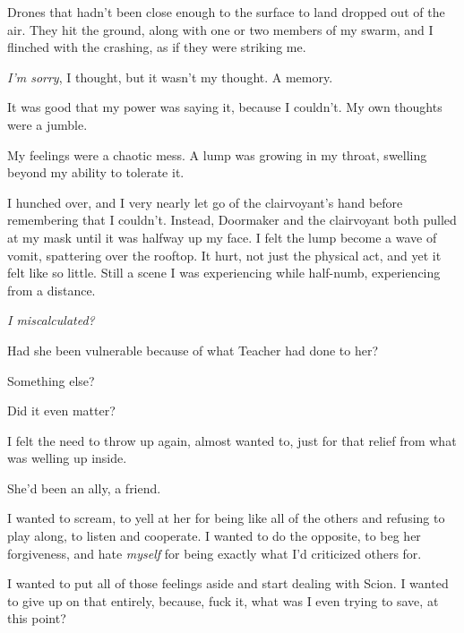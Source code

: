 Drones that hadn't been close enough to the surface to land dropped out of the air.  They hit the ground, along with one or two members of my swarm, and I flinched with the crashing, as if they were striking me.



\emph{I'm sorry}, I thought, but it wasn't my thought.  A memory.



It was good that my power was saying it, because I couldn't.  My own thoughts were a jumble.



My feelings were a chaotic mess.  A lump was growing in my throat, swelling beyond my ability to tolerate it.



I hunched over, and I very nearly let go of the clairvoyant's hand before remembering that I couldn't.  Instead, Doormaker and the clairvoyant both pulled at my mask until it was halfway up my face.  I felt the lump become a wave of vomit, spattering over the rooftop.  It hurt, not just the physical act, and yet it felt like so little.  Still a scene I was experiencing while half-numb, experiencing from a distance.



\emph{I miscalculated?}



Had she been vulnerable because of what Teacher had done to her?



Something else?



Did it even matter?



I felt the need to throw up again, almost wanted to, just for that relief from what was welling up inside.



She'd been an ally, a friend.



I wanted to scream, to yell at her for being like all of the others and refusing to play along, to listen and cooperate.  I wanted to do the opposite, to beg her forgiveness, and hate \emph{myself} for being exactly what I'd criticized others for.



I wanted to put all of those feelings aside and start dealing with Scion.  I wanted to give up on that entirely, because, fuck it, what was I even trying to save, at this point?




